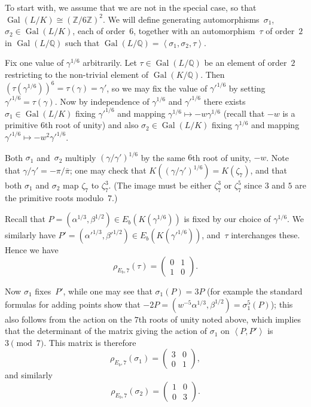 \documentclass[12pt]{amsart}
\newcommand{\Q}{\mathbb{Q}}
\newcommand{\Z}{\mathbb{Z}}
\DeclareMathOperator{\Gal}{Gal}
\def\pibar{\overline{\pi}}
\numberwithin{equation}{section}
\theoremstyle{definition}
\theoremstyle{remark}
\begin{document}
To start with, we assume that we are not in the special case, so that
$\Gal(L/K)\cong(\Z/6\Z)^2$.  We will define generating
automorphisms~$\sigma_1$, $\sigma_2\in\Gal(L/K)$, each of order~$6$, together
with an automorphism~$\tau$ of order~$2$ in $\Gal(L/\Q)$ such that
$\Gal(L/\Q)=\left<\sigma_1,\sigma_2,\tau\right>$.

Fix one value of $\gamma^{1/6}$ arbitrarily.  Let $\tau\in\Gal(L/\Q)$
be an element of order~$2$ restricting to the non-trivial element of
$\Gal(K/\Q)$.  Then $(\tau(\gamma^{1/6}))^6=\tau(\gamma)=\gamma'$, so
we may fix the value of $\gamma'^{1/6}$ by setting
$\gamma'^{1/6}=\tau(\gamma)$.  Now by independence of $\gamma^{1/6}$
and $\gamma'^{1/6}$ there exists $\sigma_1\in\Gal(L/K)$ fixing
$\gamma'^{1/6}$ and mapping $\gamma^{1/6}\mapsto-w\gamma^{1/6}$ (recall
that $-w$ is a primitive $6$th root of unity) and also
$\sigma_2\in\Gal(L/K)$ fixing $\gamma^{1/6}$ and mapping
$\gamma'^{1/6}\mapsto-w^2\gamma'^{1/6}$.

Both $\sigma_1$ and~$\sigma_2$ multiply $(\gamma/\gamma')^{1/6}$ by
the same $6$th root of unity, $-w$.  Note that
$\gamma/\gamma'=-\pi/\pibar$; one may check that
$K((\gamma/\gamma')^{1/6})=K(\zeta_7)$, and that both $\sigma_1$ and
$\sigma_2$ map $\zeta_7$ to $\zeta_7^3$.  (The image must be either
$\zeta_7^3$ or $\zeta_7^5$ since $3$ and $5$ are the primitive roots
modulo~$7$.)

Recall that $P=(\alpha^{1/3},\beta^{1/2})\in E_b(K(\gamma^{1/6}))$ is
fixed by our choice of $\gamma^{1/6}$.  We similarly have
$P'=(\alpha'^{1/3},\beta'^{1/2})\in E_b(K(\gamma'^{1/6}))$, and~$\tau$
interchanges these.  Hence we have
\[
   \rho_{E_b,7}(\tau) = \begin{pmatrix}0&1\\1&0   \end{pmatrix}.
\]


Now $\sigma_1$ fixes~$P'$, while one may see that $\sigma_1(P)=3P$
(for example the standard formulas for adding points show that
$-2P=(w^{-5}\alpha^{1/3},\beta^{1/2})=\sigma_1^5(P)$); this also
follows from the action on the $7$th roots of unity noted above, which
implies that the determinant of the matrix giving the action of
$\sigma_1$ on $\left<P,P'\right>$ is $3\pmod7$.  This matrix is
therefore
\[
   \rho_{E_b,7}(\sigma_1) = \begin{pmatrix}3&0\\0&1   \end{pmatrix},
\]
and similarly
\[
   \rho_{E_b,7}(\sigma_2) = \begin{pmatrix}1&0\\0&3   \end{pmatrix}.
\]
\end{document}
